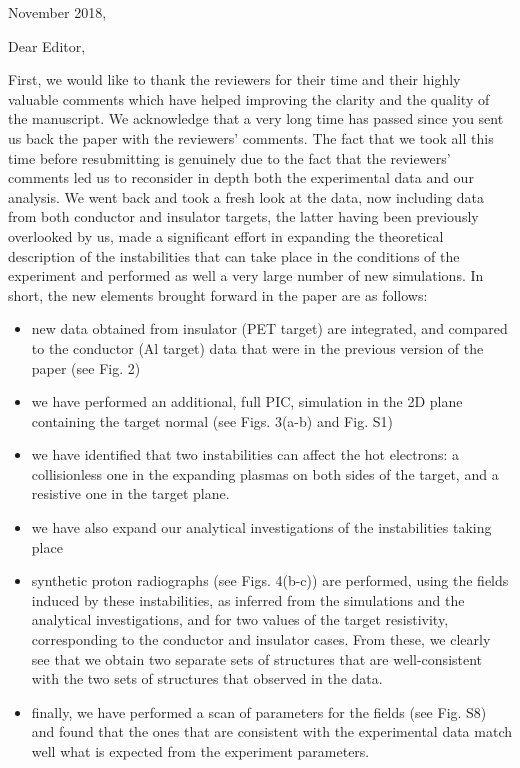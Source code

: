 \documentclass{article}
\begin{document}
November 2018,

Dear Editor,

First, we would like to thank the reviewers for their time and their highly valuable comments which have helped improving the clarity and the quality of the manuscript. We acknowledge that a very long time has passed since you sent us back the paper with the reviewers’ comments. 
The fact that we took all this time before resubmitting is genuinely due to the fact that the reviewers’ comments led us to reconsider in depth both the experimental data and our analysis. We went back and took a fresh look at the data, now including data from both conductor and insulator targets, the latter having been previously overlooked by us, made a significant effort in expanding the theoretical description of the instabilities that can take place in the conditions of the experiment and performed as well a very large number of new simulations. 
In short, the new elements brought forward in the paper are as follows:
\begin{itemize}
    \item new data obtained from insulator (PET target) are integrated, and compared to the conductor (Al target) data that were in the previous version of the paper (see Fig. 2)
    \item we have performed an additional, full PIC, simulation in the 2D plane containing the target normal (see Figs. 3(a-b) and Fig. S1)
    \item we have identified that two instabilities can affect the hot electrons: a collisionless one in the expanding plasmas on both sides of the target, and a resistive one in the target plane. 
    \item we have also expand our analytical investigations of the instabilities taking place
    \item synthetic proton radiographs (see Figs. 4(b-c)) are performed, using the fields induced by these instabilities, as inferred from the simulations and the analytical investigations, and for two values of the target resistivity, corresponding to the conductor and insulator cases. From these, we clearly see that we obtain two separate sets of structures that are well-consistent with the two sets of structures that observed in the data. 
    \item finally, we have performed a scan of parameters for the fields (see Fig. S8) and found that the ones that are consistent with the experimental data match well what is expected from the experiment parameters. 
\end{itemize}
\end{document}
